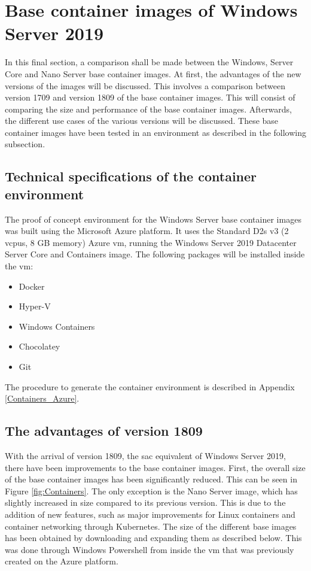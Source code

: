 \section{Base container images of Windows Server 2019}
In this final section, a comparison shall be made between the Windows, Server Core and Nano Server base container images. 
At first, the advantages of the new versions of the images will be discussed. 
This involves a comparison between version 1709 and version 1809 of the base container images. 
This will consist of comparing the size and performance of the base container images. 
Afterwards, the different use cases of the various versions will be discussed. 
These base container images have been tested in an environment as described in the following subsection.

\subsection{Technical specifications of the container environment}
The proof of concept environment for the Windows Server base container images was built using the Microsoft Azure platform. 
It uses the Standard D2s v3 (2 vcpus, 8 GB memory) Azure \acrshort{vm}, running the Windows Server 2019 Datacenter Server Core and Containers image.
The following packages will be installed inside the \acrshort{vm}:
\begin{itemize}
	\item Docker
	\item Hyper-V
	\item Windows Containers
	\item Chocolatey
	\item Git
\end{itemize}
The procedure to generate the container environment is described in Appendix \ref{Containers_Azure}.

\subsection{The advantages of version 1809}
With the arrival of version 1809, the \acrfull{sac} equivalent of Windows Server 2019, there have been improvements to the base container images. 
First, the overall size of the base container images has been significantly reduced. 
This can be seen in Figure \ref{fig:Containers}. 
The only exception is the Nano Server image, which has slightly increased in size compared to its previous version. 
This is due to the addition of new features, such as major improvements for Linux containers and container networking through Kubernetes.
The size of the different base images has been obtained by downloading and expanding them as described below. 
This was done through Windows Powershell from inside the \acrshort{vm} that was previously created on the Azure platform. 

